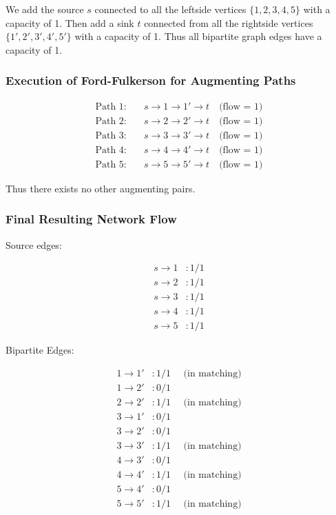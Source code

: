 \documentclass[
]{article}
\begin{document}
We add the source \(s\) connected to all the leftside vertices
\(\{ 1,2,3,4,5 \}\) with a capacity of 1. Then add a sink \(t\)
connected from all the rightside vertices \(\{ 1',2',3',4',5' \}\) with
a capacity of 1. Thus all bipartite graph edges have a capacity of 1.

\subsubsection{Execution of Ford-Fulkerson for Augmenting
Paths}\label{execution-of-ford-fulkerson-for-augmenting-paths}

\[
\begin{align}
 \text{Path 1:} \quad & s \to 1 \to 1' \to t \quad \text{(flow = 1)} \\
 \text{Path 2:} \quad & s \to 2 \to 2' \to t \quad \text{(flow = 1)} \\
 \text{Path 3:} \quad & s \to 3 \to 3' \to t \quad \text{(flow = 1)} \\
 \text{Path 4:} \quad & s \to 4 \to 4' \to t \quad \text{(flow = 1)} \\
 \text{Path 5:} \quad & s \to 5 \to 5' \to t \quad \text{(flow = 1)} 
\end{align}
\]

Thus there exists no other augmenting pairs.

\subsubsection{Final Resulting Network
Flow}\label{final-resulting-network-flow}

Source edges:

\[
\begin{align} s \to 1 &: 1/1 \\ s \to 2 &: 1/1 \\ s \to 3 &: 1/1 \\ s \to 4 &: 1/1 \\ s \to 5 &: 1/1 \end{align}
\]

Bipartite Edges:

\[
\begin{align} 1 \to 1' &: 1/1 \quad \text{ (in matching)} \\
1 \to 2' &: 0/1  \\
2 \to 2' &: 1/1 \quad \text{ (in matching)} \\
3 \to 1' &: 0/1 \\
 3 \to 2' &: 0/1 \\
3 \to 3' &: 1/1 \quad \text{ (in matching)} \\
 4 \to 3' &: 0/1 \\
4 \to 4' &: 1/1 \quad \text{ (in matching)} \\
 5 \to 4' &: 0/1 \\
5 \to 5' &: 1/1 \quad \text{ (in matching)} \end{align}
\]
\end{document}
